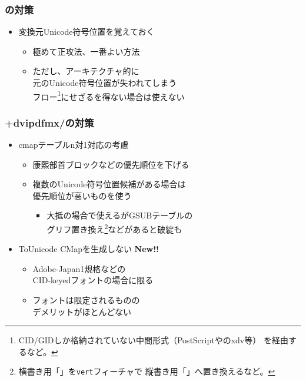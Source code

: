 \begin{frame}\frametitle{\LuaTeX の対策}
  \begin{itemize}
  \item 変換元Unicode符号位置を覚えておく
    \begin{itemize}
    \item 極めて正攻法、一番よい方法
    \item ただし、アーキテクチャ的に \\
      元のUnicode符号位置が失われてしまう \\ フロー\footnote{
      \tiny CID/GIDしか格納されていない中間形式（PostScriptや\XeTeX のxdv等）
      を経由するなど。}にせざるを得ない場合は使えない
    \end{itemize}
  \end{itemize}
\end{frame}

\begin{frame}\frametitle{\pTeX +dvipdfmx/\XeTeX の対策}
  \begin{itemize}
  \item cmapテーブルn対1対応の考慮
    \begin{itemize}
    \item 康熙部首ブロックなどの優先順位を下げる
    \item 複数のUnicode符号位置候補がある場合は \\ 優先順位が高いものを使う
      \begin{itemize}
      \item 大抵の場合で使えるがGSUBテーブルの \\
        グリフ置き換え\footnote{\tiny
        横書き用「」を\texttt{vert}フィーチャで
        縦書き用「」へ置き換えるなど。}などがあると破綻も
      \end{itemize}
    \end{itemize}

    \pause

  \item ToUnicode CMapを生成しない \textbf{\color{red} New!!}
    \begin{itemize}
    \item Adobe-Japan1規格などの \\
      CID-keyedフォントの場合に限る
    \item フォントは限定されるものの \\ デメリットがほとんどない
    \end{itemize}
  \end{itemize}
\end{frame}

